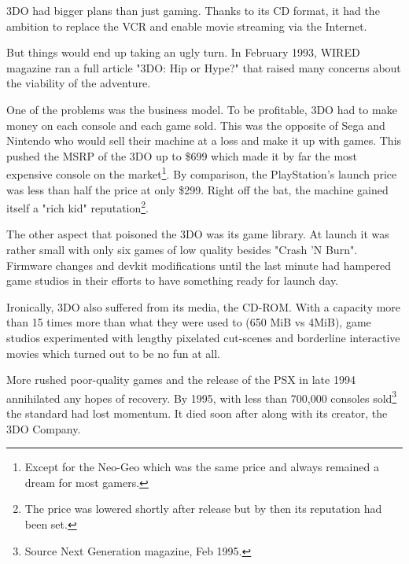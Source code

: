 \par
 3DO had bigger plans than just gaming. Thanks to its CD format, it had the ambition to replace the VCR and enable movie streaming via the Internet.\\
\par
But things would end up taking an ugly turn. In February 1993, WIRED magazine ran a full article "3DO: Hip or Hype?" that raised many concerns about the viability of the adventure.\\
\par
One of the problems was the business model. To be profitable, 3DO had to make money on each console and each game sold. This was the opposite of Sega and Nintendo who would sell their machine at a loss and make it up with games. This pushed the MSRP of the 3DO up to \$699 which made it by far the most expensive console on the market\footnote{Except for the Neo-Geo which was the same price and always remained a dream for most gamers.}. By comparison, the PlayStation's launch price was less than half the price at only \$299. Right off the bat, the machine gained itself a "rich kid" reputation\footnote{The price was lowered shortly after release but by then its reputation had been set.}.\\
\par
The other aspect that poisoned the 3DO was its game library. At launch it was rather small with only six games of low quality besides "Crash 'N Burn". Firmware changes and devkit modifications until the last minute had hampered game studios in their efforts to have something ready for launch day.\\
\par
Ironically, 3DO also suffered from its media, the CD-ROM. With a capacity more than 15 times more than what they were used to (650 MiB vs 4MiB), game studios experimented with lengthy pixelated cut-scenes and borderline interactive movies which turned out to be no fun at all.\\
\par
More rushed poor-quality games and the release of the PSX in late 1994 annihilated any hopes of recovery.
By 1995, with less than 700,000 consoles sold\footnote{Source Next Generation magazine, Feb 1995.} the standard had lost momentum. It died soon after along with its creator, the 3DO Company.






